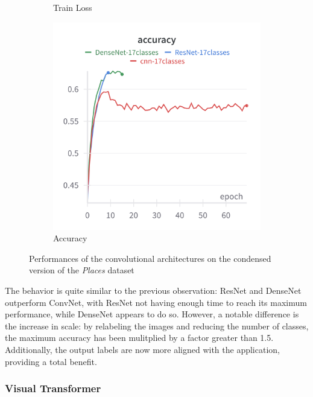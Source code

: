 \documentclass[twocolumn,superscriptaddress,aps]{revtex4-1}
\begin{document}
\begin{figure}[H]
\begin{subfigure}{0.235 \textwidth}
        \caption{Train Loss}
    \end{subfigure}
    \begin{subfigure}{0.35 \textwidth}
        \includegraphics[width = 0.99 \textwidth]{images/17classes_accuracy.png}
        \caption{Accuracy}
    \end{subfigure}
    
    \caption{Performances of the convolutional architectures on the condensed version of the \textit{Places} dataset}
    \label{fig:17_convnets}
\end{figure}

The behavior is quite similar to the previous observation: ResNet and DenseNet outperform ConvNet, with ResNet not having enough time to reach its maximum performance, while DenseNet appears to do so. However, a notable difference is the increase in scale: by relabeling the images and reducing the number of classes, the maximum accuracy has been mulitplied by a factor greater than 1.5. Additionally, the output labels are now more aligned with the application, providing a total benefit.\\

\subsubsection{Visual Transformer}
\end{document}

